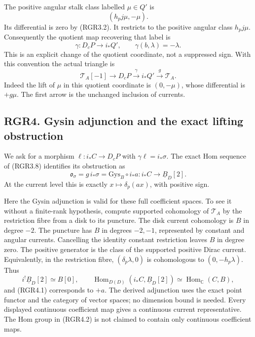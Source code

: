 The positive angular stalk class labelled \(\mu\in Q'\) is \[
 (h_pj\mu,-\mu).
 \tag{RGR3.6}
\] Its differential is zero by (RGR3.2). It restricts to the positive
angular class \(h_pj\mu\). Consequently the quotient map recovering that
label is \[
 \gamma:D_cP\longrightarrow i_*Q',\qquad
 \gamma(b,\lambda)=-\lambda.
 \tag{RGR3.7}
\] This is an explicit change of the quotient coordinate, not a
suppressed sign. With this convention the actual triangle is \[
 \mathscr T_A[-1]\longrightarrow D_cP
 \xrightarrow{\gamma}i_*Q'
 \xrightarrow{\ g\ }\mathscr T_A.
 \tag{RGR3.8}
\] Indeed the lift of \(\mu\) in this quotient coordinate is
\((0,-\mu)\), whose differential is \(+g\mu\). The first arrow is the
unchanged inclusion of currents.

\subsection{RGR4. Gysin adjunction and the exact lifting
obstruction}\label{rgr4.-gysin-adjunction-and-the-exact-lifting-obstruction}

We ask for a morphism \(\ell:i_*C\to D_cP\) with
\(\gamma\ell=i_*\sigma\). The exact Hom sequence of (RGR3.8) identifies
its obstruction as \[
 \boxed{\mathfrak o_\sigma=g\,i_*\sigma
       =\mathrm{Gys}_B\circ i_*a:
       i_*C\longrightarrow\underline B_D[2].}
 \tag{RGR4.1}
\] At the current level this is exactly \(x\mapsto\delta_p(a x)\), with
positive sign.

Here the Gysin adjunction is valid for these full coefficient spaces. To
see it without a finite-rank hypothesis, compute supported cohomology of
\(\mathscr T_A\) by the restriction fibre from a disk to its puncture.
The disk current cohomology is \(B\) in degree \(-2\). The puncture has
\(B\) in degrees \(-2,-1\), represented by constant and angular
currents. Cancelling the identity constant restriction leaves \(B\) in
degree zero. The positive generator is the class of the supported
positive Dirac current. Equivalently, in the restriction fibre,
\((\delta_p\lambda,0)\) is cohomologous to \((0,-h_p\lambda)\). Thus \[
 i^!\underline B_D[2]\simeq B[0],\qquad
 \operatorname{Hom}_{D(D)}(i_*C,\underline B_D[2])
 \simeq\operatorname{Hom}_{\mathbb C}(C,B),
 \tag{RGR4.2}
\] and (RGR4.1) corresponds to \(+a\). The derived adjunction uses the
exact point functor and the category of vector spaces; no dimension
bound is needed. Every displayed continuous coefficient map gives a
continuous current representative. The Hom group in (RGR4.2) is not
claimed to contain only continuous coefficient maps.

